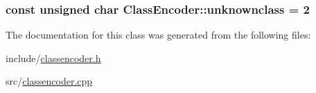 \subsubsection[{unknownclass}]{\setlength{\rightskip}{0pt plus 5cm}const unsigned char Class\+Encoder\+::unknownclass = 2\hspace{0.3cm}{\ttfamily [static]}}\label{classClassEncoder_a4a99bcd37707a9d26707e45728ee7c1d}


The documentation for this class was generated from the following files\+:\begin{DoxyCompactItemize}
\item 
include/\hyperlink{classencoder_8h}{classencoder.\+h}\item 
src/\hyperlink{classencoder_8cpp}{classencoder.\+cpp}\end{DoxyCompactItemize}
